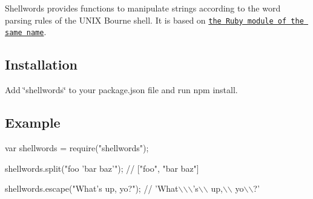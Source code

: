 Shellwords provides functions to manipulate strings according to the word parsing rules of the U\+N\+IX Bourne shell. It is based on \href{http://www.ruby-doc.org/stdlib-1.9.3/libdoc/shellwords/rdoc/Shellwords.html}{\tt the Ruby module of the same name}.

\subsection*{Installation}

Add \char`\"{}shellwords\char`\"{} to your {\ttfamily package.\+json} file and run {\ttfamily npm install}.

\subsection*{Example}


\begin{DoxyCode}
var shellwords = require("shellwords");

shellwords.split("foo 'bar baz'");
// ["foo", "bar baz"]

shellwords.escape("What's up, yo?");
// 'What\(\backslash\)\(\backslash\)\(\backslash\)'s\(\backslash\)\(\backslash\) up,\(\backslash\)\(\backslash\) yo\(\backslash\)\(\backslash\)?'
\end{DoxyCode}
 